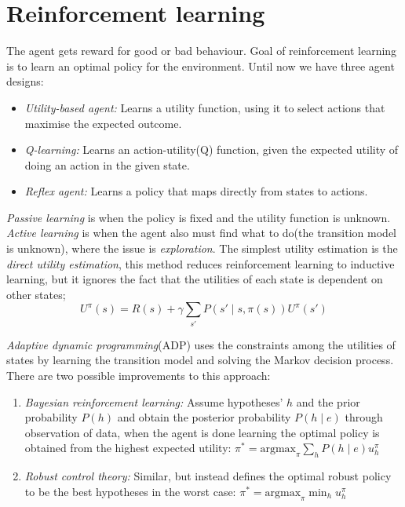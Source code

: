 \documentclass[11pt, letterpaper]{report}
\numberwithin{equation}{section}
\begin{document}
\section{Reinforcement learning}
The agent gets reward for good or bad behaviour. Goal of reinforcement learning
is to learn an optimal policy for the environment. Until now we have three agent
designs:
\begin{itemize}
\item \emph{Utility-based agent:} Learns a utility function, using it to select
  actions that maximise the expected outcome.
\item \emph{Q-learning:} Learns an action-utility(Q) function, given the
  expected utility of doing an action in the given state.
\item \emph{Reflex agent:} Learns a policy that maps directly from states to actions.
\end{itemize}

\emph{Passive learning} is when the policy is fixed and the utility function is
unknown. \emph{Active learning} is when the agent also must find what to do(the
transition model is unknown), where the issue is \emph{exploration}. The
simplest utility estimation is the \emph{direct utility estimation}, this method
reduces reinforcement learning to inductive learning, but it ignores the fact
that the utilities of each state is dependent on other states;
\setcounter{equation}{1}
\begin{equation}
  \label{eq:utility}
  U^\pi(s) = R(s) + \gamma \sum_{ s' } P(s' \mid s, \pi(s))U^\pi(s')
\end{equation}

\emph{Adaptive dynamic programming}(ADP) uses the constraints among the
utilities of states by learning the transition model and solving the Markov
decision process. There are two possible improvements to this approach:
\begin{enumerate}
\item \emph{Bayesian reinforcement learning:} Assume hypotheses' $h$ and the
  prior probability $P(h)$ and obtain the posterior probability $P(h \mid e)$
  through observation of data, when the agent is done learning the optimal
  policy is obtained from the highest expected utility: $\pi^\ast =
  \text{argmax}_\pi \sum_h P(h \mid e)u^\pi_h$
\item \emph{Robust control theory:} Similar, but instead defines the optimal
  robust policy to be the best hypotheses in the worst case: $\pi^\ast =
  \text{argmax}_\pi \min_h u^\pi_h$

\end{enumerate}
\end{document}

